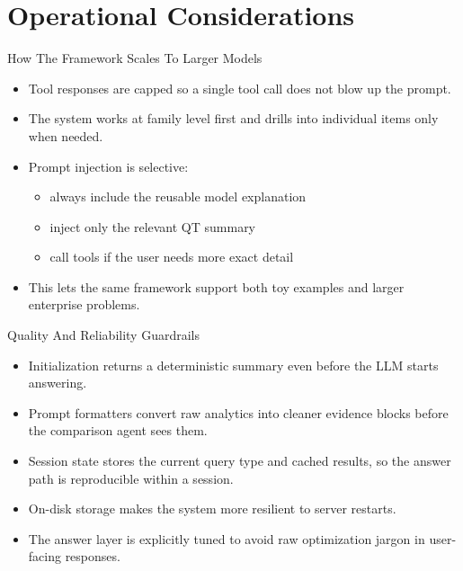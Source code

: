 \documentclass[10pt]{beamer}
\begin{document}
\section{Operational Considerations}

\begin{frame}{How The Framework Scales To Larger Models}
  \begin{itemize}
    \item Tool responses are capped so a single tool call does not blow up the prompt.
    \item The system works at family level first and drills into individual items only when needed.
    \item Prompt injection is selective:
    \begin{itemize}
      \item always include the reusable model explanation
      \item inject only the relevant QT summary
      \item call tools if the user needs more exact detail
    \end{itemize}
    \item This lets the same framework support both toy examples and larger enterprise problems.
  \end{itemize}
\end{frame}

\begin{frame}{Quality And Reliability Guardrails}
  \begin{itemize}
    \item Initialization returns a deterministic summary even before the LLM starts answering.
    \item Prompt formatters convert raw analytics into cleaner evidence blocks before the comparison agent sees them.
    \item Session state stores the current query type and cached results, so the answer path is reproducible within a session.
    \item On-disk storage makes the system more resilient to server restarts.
    \item The answer layer is explicitly tuned to avoid raw optimization jargon in user-facing responses.
  \end{itemize}
\end{frame}
\end{document}
